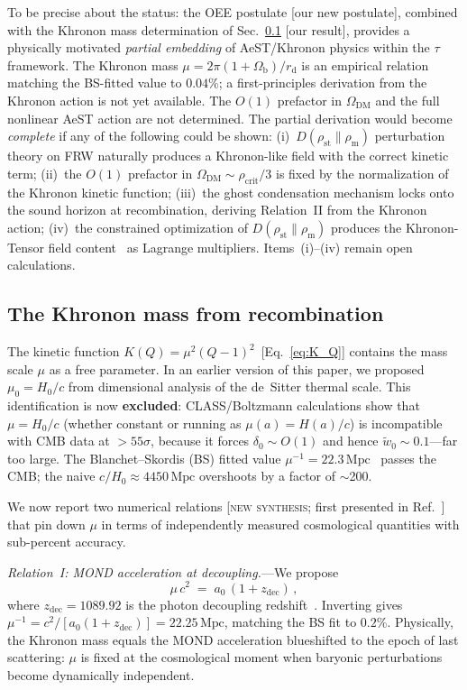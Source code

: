 \documentclass[prd,twocolumn,superscriptaddress,longbibliography,floatfix]{revtex4-2}
\newcommand{\tauasym}{\tau}
\newcommand{\rhost}{\rho_{\mathrm{st}}}
\newcommand{\rhom}{\rho_{\mathrm{m}}}
\newcommand{\OmDM}{\Omega_{\mathrm{DM}}}
\begin{document}
To be precise about the status: the OEE postulate
[our new postulate], combined with the Khronon mass
determination of Sec.~\ref{sec:running_mu} [our result],
provides a physically motivated \emph{partial embedding}
of AeST/Khronon physics within the $\tauasym$ framework.
The Khronon mass
$\mu = 2\pi(1+\Omega_{\mathrm{b}})/r_{\mathrm{d}}$
is an empirical relation matching the BS-fitted value
to $0.04\%$; a first-principles derivation from the
Khronon action is not yet available.
The $O(1)$ prefactor in $\OmDM$ and the full nonlinear
AeST action are not determined.
The partial derivation would become \emph{complete} if
any of the following could be shown:
(i)~$D(\rhost\|\rhom)$ perturbation theory on FRW
naturally produces a Khronon-like field with the
correct kinetic term;
(ii)~the $O(1)$ prefactor in
$\OmDM \sim \rho_{\mathrm{crit}}/3$ is fixed by the
normalization of the Khronon kinetic function;
(iii)~the ghost condensation mechanism locks onto the
sound horizon at recombination, deriving
Relation~II from the Khronon action;
(iv)~the constrained optimization of
$D(\rhost\|\rhom)$ produces the Khronon-Tensor field
content~\cite{BlanchetSkordis2025} as Lagrange
multipliers.
Items~(i)--(iv) remain open calculations.


\subsection{The Khronon mass from recombination}
\label{sec:running_mu}

The kinetic function
$K(Q) = \mu^2(Q-1)^2$~[Eq.~\eqref{eq:K_Q}] contains
the mass scale $\mu$ as a free parameter.
In an earlier version of this paper, we proposed
$\mu_0 = H_0/c$ from dimensional analysis of the
de~Sitter thermal scale.
This identification is now \textbf{excluded}:
CLASS/Boltzmann calculations show that $\mu = H_0/c$
(whether constant or running as $\mu(a) = H(a)/c$)
is incompatible with CMB data at $>55\sigma$, because
it forces $\delta_0 \sim O(1)$ and hence
$\tilde{w}_0 \sim 0.1$---far too large.
The Blanchet--Skordis (BS) fitted value
$\mu^{-1} = 22.3\,\mathrm{Mpc}$~\cite{BS2025}
passes the CMB; the naive $c/H_0 \approx 4450\,
\mathrm{Mpc}$ overshoots by a factor of $\sim$200.

We now report two numerical relations
[\textsc{new synthesis}; first presented in
Ref.~\cite{Huang2026_mu}]
that pin down $\mu$ in terms of independently measured
cosmological quantities with sub-percent accuracy.

\emph{Relation~I: MOND acceleration at decoupling.}---We
propose
\begin{equation}
\mu\, c^2 \;=\; a_0\,(1 + z_{\mathrm{dec}}) \,,
\label{eq:mu_rel1}
\end{equation}
where $z_{\mathrm{dec}} = 1089.92$ is the photon
decoupling redshift~\cite{Planck2018}.
Inverting gives
$\mu^{-1} = c^2/[a_0(1+z_{\mathrm{dec}})]
= 22.25\,\mathrm{Mpc}$, matching the BS fit to
$0.2\%$.
Physically, the Khronon mass equals the MOND
acceleration blueshifted to the epoch of last
scattering: $\mu$ is fixed at the cosmological
moment when baryonic perturbations become
dynamically independent.
\end{document}
